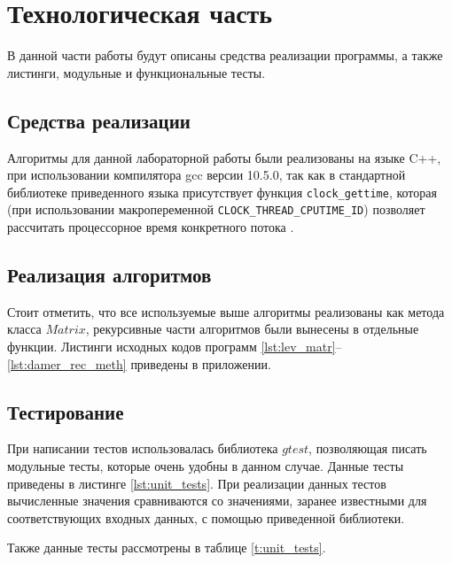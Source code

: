 \chapter{Технологическая часть}
В данной части работы будут описаны средства реализации программы, а также листинги, модульные и функциональные тесты.

\section{Средства реализации}
Алгоритмы для данной лабораторной работы были реализованы на языке C++, при использовании компилятора gcc версии 10.5.0, так как в стандартной библиотеке приведенного языка
присутствует функция \texttt{clock\_gettime}, которая (при использовании макропеременной \texttt{CLOCK\_THREAD\_CPUTIME\_ID}) позволяет рассчитать процессорное время конкретного потока \cite{cpp-time}.



\section{Реализация алгоритмов}

Стоит отметить, что все используемые выше алгоритмы реализованы как метода класса $Matrix$, рекурсивные части алгоритмов были вынесены в отдельные функции.
Листинги исходных кодов программ  \ref{lst:lev_matr}--\ref{lst:damer_rec_meth} приведены в приложении.


\section{Тестирование}
При написании тестов использовалась библиотека $gtest$, позволяющая писать модульные тесты, которые очень удобны 
в данном случае. Данные тесты приведены в листинге  \ref{lst:unit_tests}. При реализации данных тестов вычисленные значения
сравниваются со значениями, заранее известными для соответствующих входных данных, с помощью приведенной библиотеки.


Также данные тесты рассмотрены в таблице \ref{t:unit_tests}.

